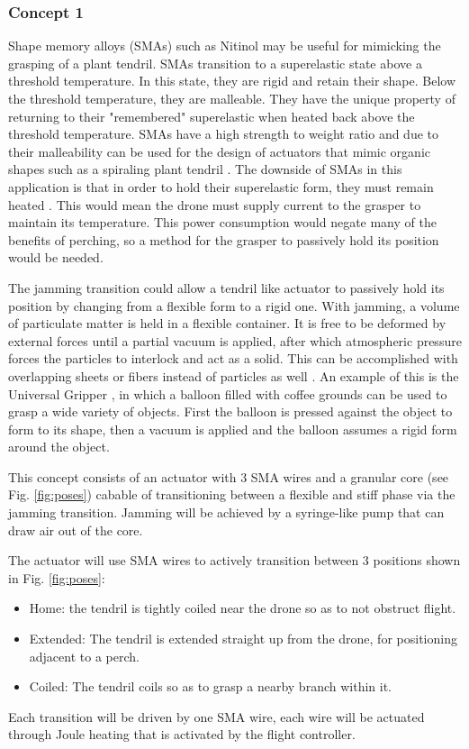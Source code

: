 \subsubsection{Concept 1}

Shape memory alloys (SMAs) such as Nitinol may be useful for mimicking the grasping of a plant tendril. SMAs transition to
a superelastic state above a threshold temperature. In this state, they are rigid and retain their shape. Below the threshold
temperature, they are malleable. They have the unique property of returning to their "remembered" superelastic when heated back
above the threshold temperature. SMAs have a high strength to weight ratio and due to their malleability can be used for the design of
actuators that mimic organic shapes such as a spiraling plant tendril \cite{baek_dexterous_2023}.
The downside of SMAs in this application is that in order to hold their superelastic form, they must remain heated \cite{wieczorek_smart_2018}.
This would mean the drone must supply current to the grasper to maintain its temperature. This power consumption would negate many of the benefits
of perching, so a method for the grasper to passively hold its position would be needed.


The jamming transition could allow a tendril like actuator to passively hold its position by changing from a flexible form
to a rigid one. With jamming, a volume of particulate matter is held in a flexible container. It is free to be deformed by
external forces until a partial vacuum is applied, after which atmospheric pressure forces the particles to interlock and act
as a solid. This can be accomplished with overlapping sheets or fibers instead of particles as well \cite{fitzgerald_review_2020}.
An example of this is the Universal Gripper \cite{brown_universal_2010}, in which a balloon filled with coffee grounds can
be used to grasp a wide variety of objects. First the balloon is pressed against the object to form to its shape, then a vacuum is
applied and the balloon assumes a rigid form around the object.  


This concept consists of an actuator with 3 SMA wires and a granular core (see Fig. \ref{fig:poses}) cabable 
of transitioning between a flexible and stiff phase via the jamming transition. Jamming will be achieved by 
a syringe-like pump that can draw air out of the core.

The actuator will use SMA wires to actively transition between 3 positions shown in Fig. \ref{fig:poses}:
\begin{itemize}
    \item Home: the tendril is tightly coiled near the drone so as to not obstruct flight.
    \item Extended: The tendril is extended straight up from the drone, for positioning adjacent to a perch.
    \item Coiled: The tendril coils so as to grasp a nearby branch within it.
\end{itemize}
Each transition will be driven by one SMA wire, each wire will be actuated through Joule heating that is activated by the flight controller.



